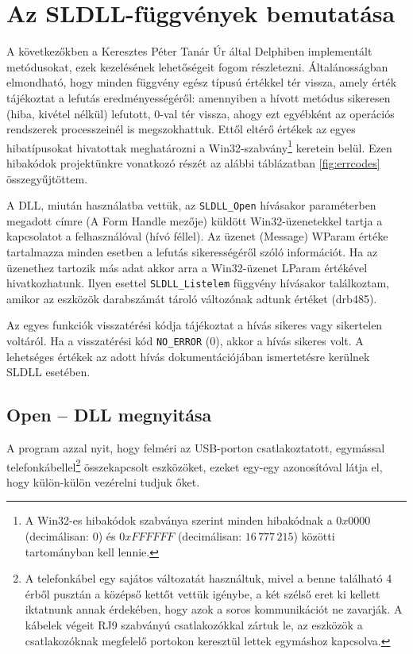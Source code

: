 \documentclass[tocnopagenum]{thesis-ekf}
\begin{document}
	\section{Az SLDLL-függvények bemutatása}
	A következőkben a Keresztes Péter Tanár Úr által Delphiben implementált metódusokat, ezek kezelésének lehetőségeit fogom részletezni.
	Általánosságban elmondható, hogy minden függvény egész típusú értékkel tér vissza, amely érték tájékoztat a lefutás eredményességéről: amennyiben a hívott metódus sikeresen (hiba, kivétel nélkül) lefutott, 0-val tér vissza, ahogy ezt egyébként az operációs rendszerek processzeinél is megszokhattuk. Ettől eltérő értékek az egyes hibatípusokat hivatottak meghatározni a Win32-szabvány\footnote{A Win32-es hibakódok szabványa szerint minden hibakódnak a $0x0000$ (decimálisan: 0) és $0xFFFFFF$ (decimálisan: $16\,777\,215$) közötti tartományban kell lennie.} keretein belül. Ezen hibakódok projektünkre vonatkozó részét az alábbi táblázatban \ref{fig:errcodes} összegyűjtöttem. \cite{errcodes}
	
	A DLL, miután használatba vettük, az \verb*|SLDLL_Open| hívásakor paraméterben megadott címre (A Form Handle mezője) küldött Win32-üzenetekkel tartja a kapcsolatot a felhasználóval (hívó féllel). Az üzenet (Message) WParam értéke tartalmazza minden esetben a lefutás sikerességéről szóló információt.
	Ha az üzenethez tartozik más adat akkor arra a Win32-üzenet LParam értékével hivatkozhatunk. Ilyen esettel \verb*|SLDLL_Listelem| függvény hívásakor találkoztam, amikor az eszközök darabszámát tároló változónak adtunk értéket (drb485).
	
	Az egyes funkciók visszatérési kódja tájékoztat a hívás sikeres vagy sikertelen voltáról. Ha a visszatérési kód \verb*|NO_ERROR| (0), akkor a hívás sikeres volt. A lehetséges értékek az adott hívás dokumentációjában ismertetésre kerülnek SLDLL esetében.
	
	\subsection{Open -- DLL megnyitása}
	A program azzal nyit, hogy felméri az USB-porton csatlakoztatott, egymással telefonkábellel\footnote{A telefonkábel egy sajátos változatát használtuk, mivel a benne található 4 érből pusztán a középső kettőt vettük igénybe, a két szélső eret ki kellett iktatnunk annak érdekében, hogy azok a soros kommunikációt ne zavarják. A kábelek végeit RJ9 szabványú csatlakozókkal zártuk le, az eszközök a csatlakozóknak megfelelő portokon keresztül lettek egymáshoz kapcsolva.} összekapcsolt eszközöket, ezeket egy-egy azonosítóval látja el, hogy külön-külön vezérelni tudjuk őket. 
		
\end{document}

